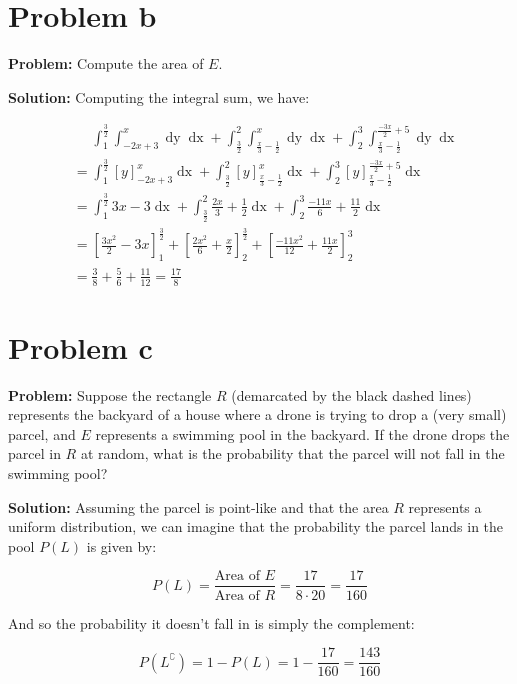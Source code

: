 \documentclass{article}
\newcommand*\Eval[3]{\left[#1\right]_{#2}^{#3}}
\begin{document}
\section*{Problem b}
\noindent\textbf{Problem:} Compute the area of $E$.
\bigskip

\noindent\textbf{Solution:} Computing the integral sum, we have:

\begin{align*}
    &\phantom{=}\int_{1}^{\frac{3}{2}}\int_{-2x+3}^{x}\mathop{dy}\mathop{dx}+
    \int^{2}_{\frac{3}{2}}\int_{\frac{x}{3}-\frac{1}{2}}^{x}\mathop{dy}\mathop{dx}+
    \int_{2}^{3}\int_{\frac{x}{3}-\frac{1}{2}}^{\frac{-3x}{2}+5}\mathop{dy}\mathop{dx}\\
    &=\int_{1}^{\frac{3}{2}}\Eval{y}{-2x+3}{x}\mathop{dx}+
    \int^{2}_{\frac{3}{2}}\Eval{y}{\frac{x}{3}-\frac{1}{2}}{x}\mathop{dx}+
    \int_{2}^{3}\Eval{y}{\frac{x}{3}-\frac{1}{2}}{\frac{-3x}{2}+5}\mathop{dx}\\
    &=\int_{1}^{\frac{3}{2}}3x-3\mathop{dx}+
    \int^{2}_{\frac{3}{2}}\frac{2x}{3}+\frac{1}{2}\mathop{dx}+
    \int_{2}^{3}\frac{-11x}{6}+\frac{11}{2}\mathop{dx}\\
    &=\Eval{\frac{3x^2}{2}-3x}{1}{\frac{3}{2}}+
    \Eval{\frac{2x^2}{6}+\frac{x}{2}}{2}{\frac{3}{2}}+
    \Eval{\frac{-11x^2}{12}+\frac{11x}{2}}{2}{3}\\
    &=\frac{3}{8}+\frac{5}{6}+\frac{11}{12}=\frac{17}{8}
\end{align*}

\section*{Problem c}
\noindent\textbf{Problem:} Suppose the rectangle $R$ (demarcated by the black dashed lines) represents the backyard of a house where a drone is trying to
drop a (very small) parcel, and $E$ represents a swimming pool in the backyard. If the drone drops the parcel in $R$ at random, what is the probability that the parcel will not fall in the swimming pool?
\bigskip

\noindent\textbf{Solution:} Assuming the parcel is point-like and that the area $R$ represents a uniform distribution, we can imagine that the probability the parcel lands in the pool $P(L)$ is given by:

\begin{equation*}
    P(L)=\frac{\text{Area of } E}{\text{Area of } R}=\frac{17}{8\cdot20}=\frac{17}{160}
\end{equation*}

And so the probability it doesn't fall in is simply the complement:

\begin{equation*}
    P(L^\complement)=1-P(L)=1-\frac{17}{160}=\frac{143}{160}
\end{equation*}
\end{document}
